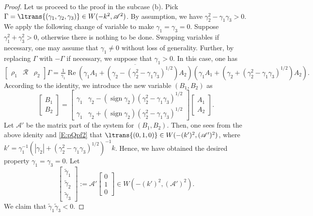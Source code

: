 \documentclass[11pt,a4paper,oneside]{amsart}
\theoremstyle{plain}
\theoremstyle{remark}
\numberwithin{equation}{section}
\renewcommand{\Re}{\operatorname{Re}}
\DeclareMathOperator{\sign}{sign}
\theoremstyle{definition}
\begin{document}
\begin{proof}
Let us proceed to the proof in the subcase (b). 
Pick $\Gamma=\ltrans{(\gamma_1,\gamma_2,\gamma_3)} \in W(-k^2,\mathscr{A}^2)$.
By assumption, we have $\gamma_2^2-\gamma_1\gamma_3>0$.
We apply the following change of variable to make $\gamma_1=\gamma_3=0$.
Suppose $\gamma_1^2+\gamma_3^2>0$, otherwise there is nothing to be done. 
Swapping variables if necessary, one may assume that
 $\gamma_1\neq0$ without loss of generality.
Further, by replacing $\Gamma$ with $-\Gamma$ if necessary, we suppose that $\gamma_1>0$.
In this case, one has
\[
	\begin{bmatrix}
	\rho_1 & \mathcal{R} & \rho_2
	\end{bmatrix}\Gamma
	=%
	\tfrac1{\gamma_1} \Re \overline{( \gamma_1 A_1 +(\gamma_2-(\gamma_2^2-\gamma_1\gamma_3)^{1/2})A_2)}( \gamma_1 A_1 +(\gamma_2+(\gamma_2^2-\gamma_1\gamma_3)^{1/2})A_2).
\]
According to the identity,
we introduce the new variable $(B_1,B_2)$  as
\[
	\begin{bmatrix} B_1 \\ B_2 \end{bmatrix} = 
	\begin{bmatrix}\gamma_1 &\gamma_2- (\sign \gamma_2)(\gamma_2^2-\gamma_1\gamma_3)^{1/2} \\
	\gamma_1 &\gamma_2+ (\sign \gamma_2) (\gamma_2^2-\gamma_1\gamma_3)^{1/2}
	\end{bmatrix}
	\begin{bmatrix} A_1 \\ A_2 \end{bmatrix}.
\]
Let $\mathscr{A}'$ be the matrix part of the system for $(B_1,B_2)$.
Then, one sees from the above  idenity and \eqref{E:pQpf2} that
$\ltrans{(0,1,0)}\in W(-(k')^2,(\mathscr{A}')^2)$,
where $k'=\gamma_1^{-1}(|\gamma_2|+(\gamma_2^2-\gamma_1\gamma_3)^{1/2})^{-1}k$.
Hence, we have obtained the desired property $\gamma_1=\gamma_3=0$.
Let 
\[
	 \begin{bmatrix} \widetilde{\gamma}_1 \\ \widetilde{\gamma}_2 \\ \widetilde{\gamma}_3 \end{bmatrix}:=\mathscr{A}'\begin{bmatrix} 0 \\1\\0 \end{bmatrix} \in W(-(k')^2,(\mathscr{A}')^2)
	.
\]
We claim that $\widetilde{\gamma}_1\widetilde{\gamma}_3<0$.

\end{proof}
\end{document}
